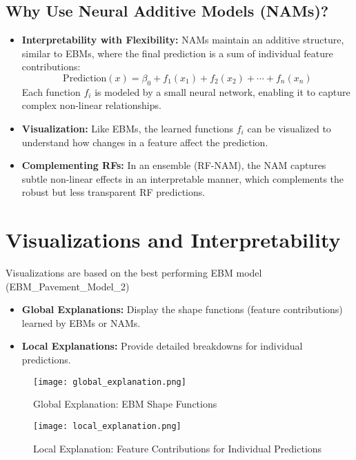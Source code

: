 \documentclass{article}
\begin{document}
\subsection{Why Use Neural Additive Models (NAMs)?}
\begin{itemize}
    \item \textbf{Interpretability with Flexibility:} NAMs maintain an additive structure, similar to EBMs, where the final prediction is a sum of individual feature contributions:
    \[
    \text{Prediction}(x) = \beta_0 + f_1(x_1) + f_2(x_2) + \cdots + f_n(x_n)
    \]
    Each function \( f_i \) is modeled by a small neural network, enabling it to capture complex non-linear relationships.
    \item \textbf{Visualization:} Like EBMs, the learned functions \( f_i \) can be visualized to understand how changes in a feature affect the prediction.
    \item \textbf{Complementing RFs:} In an ensemble (RF-NAM), the NAM captures subtle non-linear effects in an interpretable manner, which complements the robust but less transparent RF predictions.
\end{itemize}

\section{Visualizations and Interpretability}
Visualizations are based on the best performing EBM model (EBM\_Pavement\_Model\_2)
\begin{itemize}
    \item \textbf{Global Explanations:} Display the shape functions (feature contributions) learned by EBMs or NAMs.
    \item \textbf{Local Explanations:} Provide detailed breakdowns for individual predictions.
\end{itemize}

\begin{figure}[H]
   \centering
   \texttt{[image: global\_explanation.png]}
   \caption{Global Explanation: EBM Shape Functions}
   \label{fig:global_explanation}
\end{figure}

\begin{figure}[H]
   \centering
   \texttt{[image: local\_explanation.png]}
   \caption{Local Explanation: Feature Contributions for Individual Predictions}
   \label{fig:local_explanation}
\end{figure}
\end{document}

